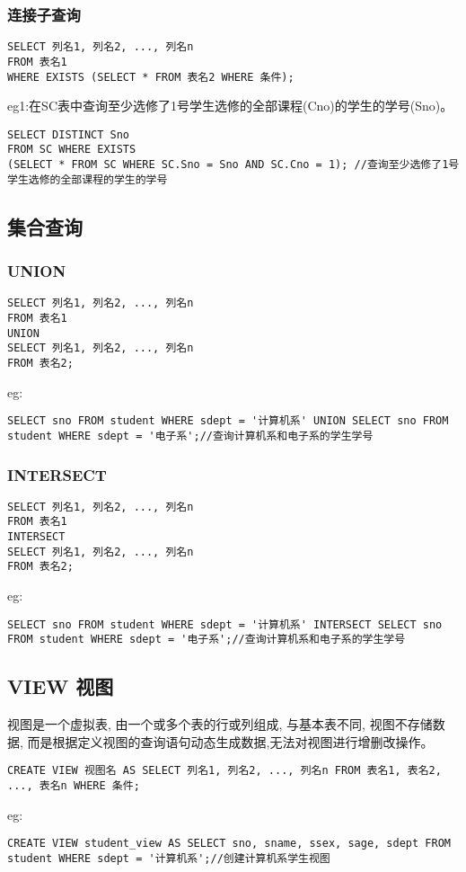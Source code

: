 \subsubsection{连接子查询}
\begin{lstlisting}
SELECT 列名1, 列名2, ..., 列名n
FROM 表名1
WHERE EXISTS (SELECT * FROM 表名2 WHERE 条件);
\end{lstlisting}
eg1:在SC表中查询至少选修了1号学生选修的全部课程(Cno)的学生的学号(Sno)。
\begin{lstlisting}
SELECT DISTINCT Sno
FROM SC WHERE EXISTS 
(SELECT * FROM SC WHERE SC.Sno = Sno AND SC.Cno = 1); //查询至少选修了1号学生选修的全部课程的学生的学号
\end{lstlisting}
\subsection{集合查询}
\subsubsection{UNION}
\begin{lstlisting}
SELECT 列名1, 列名2, ..., 列名n
FROM 表名1
UNION
SELECT 列名1, 列名2, ..., 列名n
FROM 表名2;
\end{lstlisting}
eg:
\begin{lstlisting}
SELECT sno FROM student WHERE sdept = '计算机系' UNION SELECT sno FROM student WHERE sdept = '电子系';//查询计算机系和电子系的学生学号
\end{lstlisting}
\subsubsection{INTERSECT}
\begin{lstlisting}
SELECT 列名1, 列名2, ..., 列名n
FROM 表名1
INTERSECT
SELECT 列名1, 列名2, ..., 列名n
FROM 表名2;
\end{lstlisting}
eg:
\begin{lstlisting}
SELECT sno FROM student WHERE sdept = '计算机系' INTERSECT SELECT sno FROM student WHERE sdept = '电子系';//查询计算机系和电子系的学生学号
\end{lstlisting}
\subsection{VIEW 视图}
视图是一个虚拟表, 由一个或多个表的行或列组成, 与基本表不同, 视图不存储数据, 而是根据定义视图的查询语句动态生成数据,无法对视图进行增删改操作。
\begin{lstlisting}
CREATE VIEW 视图名 AS SELECT 列名1, 列名2, ..., 列名n FROM 表名1, 表名2, ..., 表名n WHERE 条件;
\end{lstlisting}
eg:
\begin{lstlisting}
CREATE VIEW student_view AS SELECT sno, sname, ssex, sage, sdept FROM student WHERE sdept = '计算机系';//创建计算机系学生视图
\end{lstlisting}

